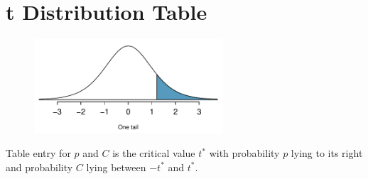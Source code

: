 \clearpage
\thispagestyle{empty}


\section{t Distribution Table }
\label{tDistributionTable2}

\newcommand{\gray}{\rowcolor[gray]{0.90}}

\vspace*{-0.75cm}

\begin{figure}[h]
\centering
\includegraphics[width=7cm]{extraTeX/appendix/figures/tTails/tTails2.pdf}
\label{tTails2}
\end{figure}
\noindent

\vspace{-0.2cm}

\small{
\noindent
Table entry for $p$ and $C$ is the critical value $t^{*}$ with probability $p$ lying to its right and probability $C$ lying between $-t^{*}$ and $t^{*}$.}

\vspace*{-0.30cm}

